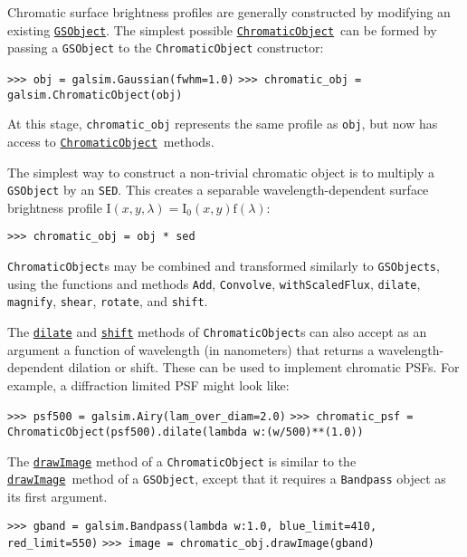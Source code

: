 \documentclass[preprint,10pt]{../../devel/modules/aastex}
\newcommand\GSObject{\href{http://galsim-developers.github.io/GalSim/classgalsim_1_1base_1_1_g_s_object.html}{\texttt{GSObject}}}
\newcommand\ChromaticObject{\href{http://galsim-developers.github.io/GalSim/classgalsim_1_1chromatic_1_1_chromatic_object.html}{\texttt{ChromaticObject}}}
\newcommand\drawImage{\href{http://galsim-developers.github.io/GalSim/classgalsim_1_1base_1_1_g_s_object.html\#aafe6ca9d84fe81543fbc105b897273db}{\texttt{drawImage}}}
\begin{document}
Chromatic surface brightness profiles are generally constructed by modifying an existing
\GSObject.  The simplest possible \ChromaticObject\ can be formed by passing a
\texttt{GSObject} to the \texttt{ChromaticObject} constructor:

\texttt{>>> obj = galsim.Gaussian(fwhm=1.0)}\newline
\texttt{>>> chromatic\_obj = galsim.ChromaticObject(obj)}

At this stage, \texttt{chromatic\_obj} represents the same profile as \texttt{obj}, but
now has access to \ChromaticObject\ methods.

The simplest way to construct a non-trivial chromatic object is to multiply a \texttt{GSObject} by
an \texttt{SED}.  This creates a separable wavelength-dependent surface brightness profile
$\mathrm{I}(x, y, \lambda) = \mathrm{I}_0(x, y) \mathrm{f}(\lambda)$:

\texttt{>>> chromatic\_obj = obj * sed}

\texttt{ChromaticObject}s may be combined and transformed similarly to
\texttt{GSObjects}, using the functions and methods \texttt{Add}, \texttt{Convolve}, \texttt{withScaledFlux}, \texttt{dilate}, \texttt{magnify}, \texttt{shear}, \texttt{rotate}, and \texttt{shift}.

The \href{http://galsim-developers.github.io/GalSim/classgalsim_1_1chromatic_1_1_chromatic_object.html#adb05a4f0dadc3c7cbc361ec97984e6f1}{\texttt{dilate}} and \href{http://galsim-developers.github.io/GalSim/classgalsim_1_1chromatic_1_1_chromatic_object.html#ab266ee1207d60ba7a9fb6b32a4ef6ab2}{\texttt{shift}} methods of
\texttt{ChromaticObject}s can also accept as an argument a function of wavelength (in nanometers)
that returns a wavelength-dependent dilation or shift.  These can be used to implement
chromatic PSFs.  For example, a diffraction limited PSF might look
like:

\texttt{>>> psf500 = galsim.Airy(lam\_over\_diam=2.0)}\newline
\texttt{>>> chromatic\_psf = ChromaticObject(psf500).dilate(lambda w:(w/500)**(1.0))}

The \href{http://galsim-developers.github.io/GalSim/classgalsim_1_1chromatic_1_1_chromatic_object.html#a4228098295ee04e4f491567a9ce3b28f}{\texttt{drawImage}} method of a \texttt{ChromaticObject} is similar to the \drawImage\ method of a \texttt{GSObject},
except that it requires a \texttt{Bandpass} object as its first
argument.

\texttt{>>> gband = galsim.Bandpass(lambda w:1.0, blue\_limit=410, red\_limit=550)} \newline
\texttt{>>> image = chromatic\_obj.drawImage(gband)}
\end{document}

